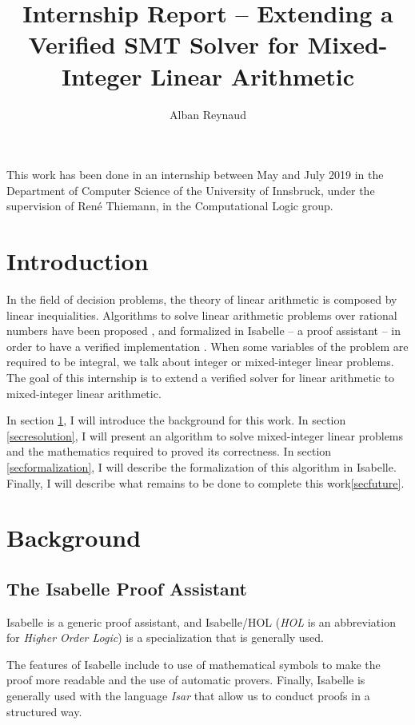 \documentclass{article}
\title{Internship Report -- Extending a Verified SMT Solver for Mixed-Integer
Linear Arithmetic}
\author{Alban Reynaud}
\begin{document}
\maketitle

This work has been done in an internship between May and July 2019
in the Department of Computer Science
of the University of Innsbruck, under the supervision of René Thiemann, in the
Computational Logic group.

\tableofcontents

\pagebreak

\section*{Introduction}
In the field of decision problems, the theory of linear arithmetic is
composed by linear inequialities. Algorithms to solve linear arithmetic
problems over rational numbers have been proposed \cite{Dutertre2006},
and formalized in Isabelle -- a proof assistant -- in order to have a verified
implementation \cite{Spasic2012, BHT2019, Thiemann2018}. When some variables of
the problem are required to be integral, we talk about integer or mixed-integer
linear problems. The goal of this internship is to extend a verified solver
for linear arithmetic to mixed-integer linear arithmetic.

In section \ref{secback}, I will introduce the background for
this work. In section \ref{secresolution}, I will present an algorithm to solve
mixed-integer linear problems and the mathematics required to proved its
correctness.
In section \ref{secformalization}, I will describe the formalization of this
algorithm in Isabelle. Finally, I will describe what remains to be done to
complete this work\ref{secfuture}.

\section{Background}
\label{secback}

\subsection{The Isabelle Proof Assistant}
Isabelle \cite{Isabelle} is a generic proof assistant, and Isabelle/HOL
(\textit{HOL} is an abbreviation for \textit{Higher Order Logic}) is a
specialization that is generally used.

The features of Isabelle include to use of mathematical symbols to make the
proof more readable and the use of automatic provers.
Finally, Isabelle is generally used with the language \textit{Isar} that allow
us to conduct proofs in a structured way.
\end{document}
